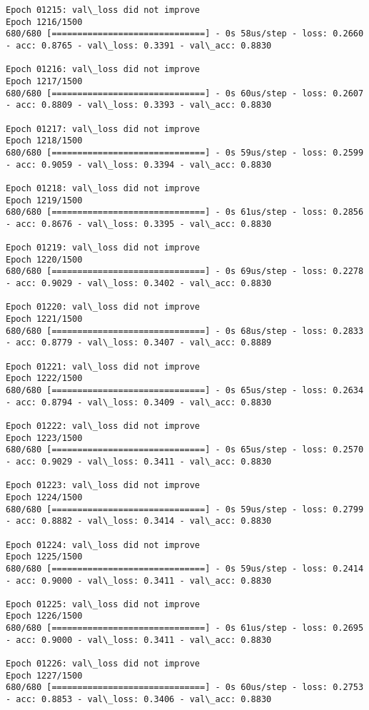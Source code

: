 \documentclass[11pt]{article}
\begin{document}
\begin{Verbatim}[commandchars=\\\{\}]
Epoch 01215: val\_loss did not improve
Epoch 1216/1500
680/680 [==============================] - 0s 58us/step - loss: 0.2660 - acc: 0.8765 - val\_loss: 0.3391 - val\_acc: 0.8830

Epoch 01216: val\_loss did not improve
Epoch 1217/1500
680/680 [==============================] - 0s 60us/step - loss: 0.2607 - acc: 0.8809 - val\_loss: 0.3393 - val\_acc: 0.8830

Epoch 01217: val\_loss did not improve
Epoch 1218/1500
680/680 [==============================] - 0s 59us/step - loss: 0.2599 - acc: 0.9059 - val\_loss: 0.3394 - val\_acc: 0.8830

Epoch 01218: val\_loss did not improve
Epoch 1219/1500
680/680 [==============================] - 0s 61us/step - loss: 0.2856 - acc: 0.8676 - val\_loss: 0.3395 - val\_acc: 0.8830

Epoch 01219: val\_loss did not improve
Epoch 1220/1500
680/680 [==============================] - 0s 69us/step - loss: 0.2278 - acc: 0.9029 - val\_loss: 0.3402 - val\_acc: 0.8830

Epoch 01220: val\_loss did not improve
Epoch 1221/1500
680/680 [==============================] - 0s 68us/step - loss: 0.2833 - acc: 0.8779 - val\_loss: 0.3407 - val\_acc: 0.8889

Epoch 01221: val\_loss did not improve
Epoch 1222/1500
680/680 [==============================] - 0s 65us/step - loss: 0.2634 - acc: 0.8794 - val\_loss: 0.3409 - val\_acc: 0.8830

Epoch 01222: val\_loss did not improve
Epoch 1223/1500
680/680 [==============================] - 0s 65us/step - loss: 0.2570 - acc: 0.9029 - val\_loss: 0.3411 - val\_acc: 0.8830

Epoch 01223: val\_loss did not improve
Epoch 1224/1500
680/680 [==============================] - 0s 59us/step - loss: 0.2799 - acc: 0.8882 - val\_loss: 0.3414 - val\_acc: 0.8830

Epoch 01224: val\_loss did not improve
Epoch 1225/1500
680/680 [==============================] - 0s 59us/step - loss: 0.2414 - acc: 0.9000 - val\_loss: 0.3411 - val\_acc: 0.8830

Epoch 01225: val\_loss did not improve
Epoch 1226/1500
680/680 [==============================] - 0s 61us/step - loss: 0.2695 - acc: 0.9000 - val\_loss: 0.3411 - val\_acc: 0.8830

Epoch 01226: val\_loss did not improve
Epoch 1227/1500
680/680 [==============================] - 0s 60us/step - loss: 0.2753 - acc: 0.8853 - val\_loss: 0.3406 - val\_acc: 0.8830


\end{Verbatim}
\end{document}
